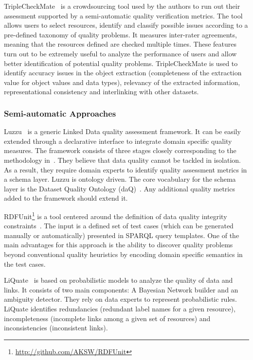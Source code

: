 \documentclass[onecolumn, crcready]{../../Util/LaTEX/iosart2c}
\begin{document}
TripleCheckMate~\cite{Kontokostas:KESW:13} is a crowdsourcing tool used by the authors to run out their assessment supported by a semi-automatic quality verification metrics. The tool allows users to select resources, identify and classify possible issues according to a pre-defined taxonomy of quality problems. It measures inter-rater agreements, meaning that the resources defined are checked multiple times. These features turn out to be extremely useful to analyze the performance of users and allow better identification of potential quality problems. TripleCheckMate is used to identify accuracy issues in the object extraction (completeness of the extraction value for object values and data types), relevancy of the extracted information, representational consistency and interlinking with other datasets.

\subsubsection{Semi-automatic Approaches}
Luzzu~\cite{Debattista:CoRR:14} is a generic Linked Data quality assessment framework. It can be easily extended through a declarative interface to integrate domain specific quality measures. The framework consists of three stages closely corresponding to the methodology in~\cite{Anisa:LDQ:14}. They believe that data quality cannot be tackled in isolation. As a result, they require domain experts to identify quality assessment metrics in a schema layer. Luzzu is ontology driven. The core vocabulary for the schema layer is the Dataset Quality Ontology (daQ)~\cite{Debattista:WWW:14}. Any additional quality metrics added to the framework should extend it.

RDFUnit\footnote{\url{http://github.com/AKSW/RDFUnit}} is a tool centered around the definition of data quality integrity constraints~\cite{Kontokostas:WWW:14}. The input is a defined set of test cases (which can be generated manually or automatically) presented in SPARQL query templates. One of the main advantages for this approach is the ability to discover quality problems beyond conventional quality heuristics by encoding domain specific semantics in the test cases.

LiQuate~\cite{Ruckhaus:ESWC:14} is based on probabilistic models to analyze the quality of data and links. It consists of two main components: A Bayesian Network builder and an ambiguity detector. They rely on data experts to represent probabilistic rules. LiQuate identifies redundancies (redundant label names for a given resource), incompleteness (incomplete links among a given set of resources) and inconsistencies (inconsistent links).
\end{document}

